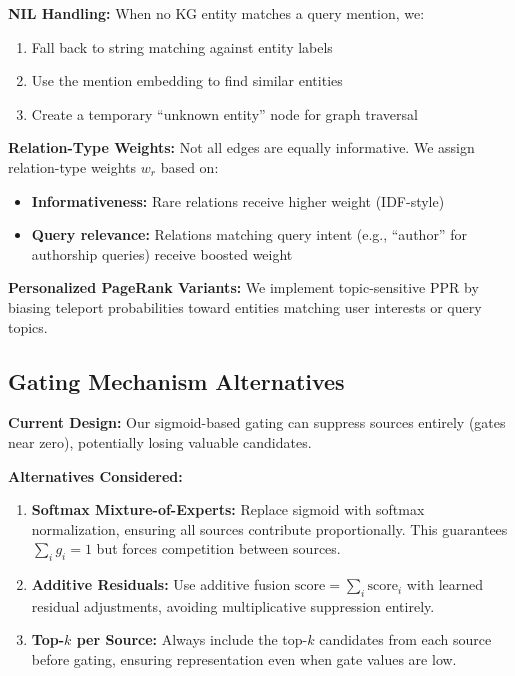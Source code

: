 \documentclass[11pt,a4paper]{article}
\begin{document}
\textbf{NIL Handling:} When no KG entity matches a query mention, we:
\begin{enumerate}
    \item Fall back to string matching against entity labels
    \item Use the mention embedding to find similar entities
    \item Create a temporary ``unknown entity'' node for graph traversal
\end{enumerate}

\textbf{Relation-Type Weights:} Not all edges are equally informative. We assign relation-type weights $w_r$ based on:
\begin{itemize}
    \item \textbf{Informativeness:} Rare relations receive higher weight (IDF-style)
    \item \textbf{Query relevance:} Relations matching query intent (e.g., ``author'' for authorship queries) receive boosted weight
\end{itemize}

\textbf{Personalized PageRank Variants:} We implement topic-sensitive PPR \citep{haveliwala2003topic} by biasing teleport probabilities toward entities matching user interests or query topics.

\subsection{Gating Mechanism Alternatives}
\label{sec:gating_alternatives}

\textbf{Current Design:} Our sigmoid-based gating can suppress sources entirely (gates near zero), potentially losing valuable candidates.

\textbf{Alternatives Considered:}
\begin{enumerate}
    \item \textbf{Softmax Mixture-of-Experts:} Replace sigmoid with softmax normalization, ensuring all sources contribute proportionally. This guarantees $\sum_i g_i = 1$ but forces competition between sources.
    
    \item \textbf{Additive Residuals:} Use additive fusion $\text{score} = \sum_i \text{score}_i$ with learned residual adjustments, avoiding multiplicative suppression entirely.
    
    \item \textbf{Top-$k$ per Source:} Always include the top-$k$ candidates from each source before gating, ensuring representation even when gate values are low.
\end{enumerate}
\end{document}
